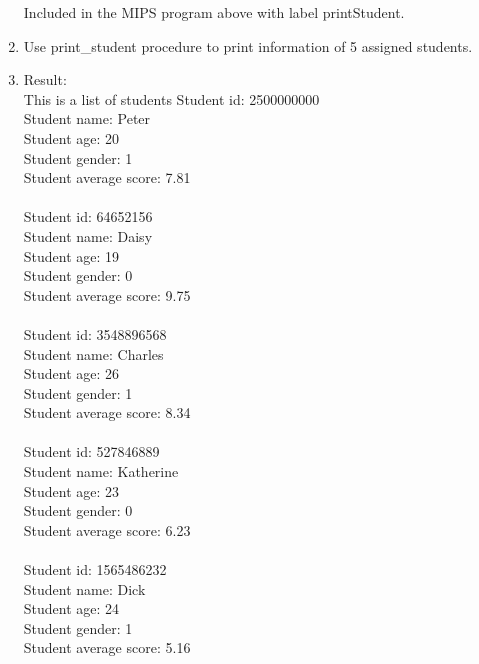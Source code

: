 \documentclass[12pt,a4paper]{article}
\begin{document}
\begin{enumerate}
        Included in the MIPS program above with label printStudent.

  \item Use print\_student procedure to print information of 5 assigned students.\\

  \item[\bullet] Result:\\

        This is a list of students
        Student id: 2500000000 \\
        Student name: Peter \\
        Student age: 20\\
        Student gender: 1\\
        Student average score: 7.81\\
        \\
        Student id: 64652156\\
        Student name: Daisy \\
        Student age: 19\\
        Student gender: 0\\
        Student average score: 9.75\\
        \\
        Student id: 3548896568\\
        Student name: Charles\\
        Student age: 26\\
        Student gender: 1\\
        Student average score: 8.34\\
        \\
        Student id: 527846889\\
        Student name: Katherine\\
        Student age: 23\\
        Student gender: 0\\
        Student average score: 6.23\\
        \\
        Student id: 1565486232\\
        Student name: Dick\\
        Student age: 24\\
        Student gender: 1\\
        Student average score: 5.16\\

\end{enumerate}
\end{document}
